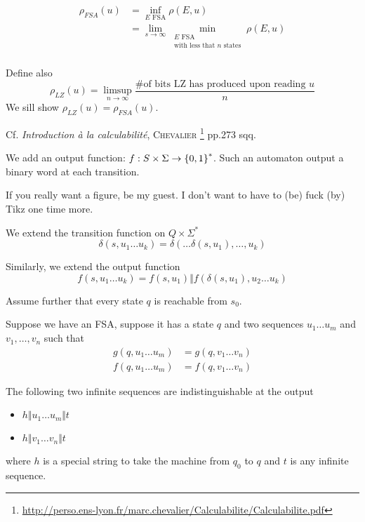 \[
    \begin{aligned}
        \rho_{FSA}(u) &= \inf\limits_{E\text{ FSA}} \rho(E,u)\\
        &= \lim\limits_{s \to \infty}\min\limits_{\substack{E\text{ FSA}\\\text{with less that }n \text{ states}}} \rho(E,u)\\
    \end{aligned}
\]

Define also
\[
        \rho_{LZ}(u) = \limsup\limits_{n\to\infty} \frac{\text{\# of bits LZ has produced upon reading }u}{n}
\]
We sill show $\rho_{LZ}(u) = \rho_{FSA}(u)$.

\begin{definition}
    Cf. \textit{Introduction à la calculabilité}, \textsc{Chevalier} \footnote{\url{http://perso.ens-lyon.fr/marc.chevalier/Calculabilite/Calculabilite.pdf}} pp.273 sqq.
\end{definition}

We add an output function: $f:S\times \Sigma \to \left\{ 0,1 \right\}^*$. Such an automaton output a binary word at each transition.

If you really want a figure, be my guest. I don't want to have to (be) fuck (by) Tikz one time more.

\begin{notation}
    We extend the transition function on $Q \times \Sigma^*$
    \[
        \delta(s, u_1\ldots u_k) = \delta(\ldots\delta(s, u_1),\ldots,u_k)
    \]
    
    Similarly, we extend the output function
    \[
        f(s,u_1\ldots u_k) = f(s,u_1) \Vert f(\delta(s, u_1), u_2\ldots u_k)    
    \]
\end{notation}

Assume further that every state $q$ is reachable from $s_0$.

Suppose we have an FSA, suppose it has a state $q$ and two sequences $u_1\ldots u_m$ and $v_1,\ldots,v_n$ such that
\[
    \begin{aligned}
        g(q, u_1\ldots u_m) &= g(q, v_1\ldots v_n)\\
        f(q, u_1\ldots u_m) &= f(q, v_1\ldots v_n)
    \end{aligned}
\]

\begin{theorem}
    The following two infinite sequences are indistinguishable at the output
    \begin{itemize}
        \item $h \Vert u_1 \ldots u_m \Vert t$
        \item $h \Vert v_1 \ldots v_n \Vert t$
    \end{itemize}
    where $h$ is a special string to take the machine from $q_0$ to $q$ and $t$ is any infinite sequence.
\end{theorem}

